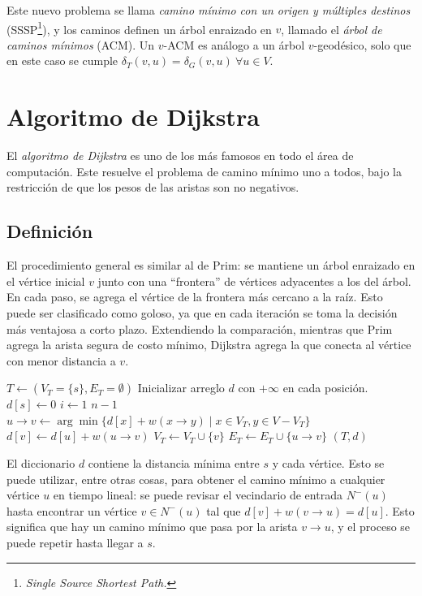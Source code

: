 \documentclass[a4paper]{report}
\begin{document}
Este nuevo problema se llama \textit{camino mínimo con un origen y múltiples destinos} (SSSP\footnote{\textit{Single Source Shortest Path.}}), y los caminos definen un árbol enraizado en $v$, llamado el \textit{árbol de caminos mínimos} (ACM). Un $v$-ACM es análogo a un árbol $v$-geodésico, solo que en este caso se cumple $\delta_T(v, u) = \delta_G(v, u)\ \forall u \in V$.

\section{Algoritmo de Dijkstra}

El \textit{algoritmo de Dijkstra} es uno de los más famosos en todo el área de computación. Este resuelve el problema de camino mínimo uno a todos, bajo la restricción de que los pesos de las aristas son no negativos.

\subsection{Definición}

El procedimiento general es similar al de Prim: se mantiene un árbol enraizado en el vértice inicial $v$ junto con una ``frontera'' de vértices adyacentes a los del árbol. En cada paso, se agrega el vértice de la frontera más cercano a la raíz. Esto puede ser clasificado como goloso, ya que en cada iteración se toma la decisión más ventajosa a corto plazo. Extendiendo la comparación, mientras que Prim agrega la arista segura de costo mínimo, Dijkstra agrega la que conecta al vértice con menor distancia a $v$.

\begin{codebox}
    \li $T \gets (V_T = \{s\}, E_T = \emptyset)$
    \li Inicializar arreglo $d$ con $+\infty$ en cada posición.
    \li $d[s] \gets 0$
    \li \For $i \gets 1$ \To $n - 1$ \Do
    \li $u \rightarrow v \gets \arg\min{\{d[x] + w(x \rightarrow y) \mid x \in V_T, y \in V - V_T\}}$
    \li $d[v] \gets d[u] + w(u \rightarrow v)$
    \li $V_T \gets V_T \cup \{v\}$
    \li $E_T \gets E_T \cup \{u \rightarrow v\}$
    \End
    \li \Return $(T, d)$
\end{codebox}

El diccionario $d$ contiene la distancia mínima entre $s$ y cada vértice. Esto se puede utilizar, entre otras cosas, para obtener el camino mínimo a cualquier vértice $u$ en tiempo lineal: se puede revisar el vecindario de entrada $N^-(u)$ hasta encontrar un vértice $v \in N^-(u)$ tal que $d[v] + w(v \rightarrow u) = d[u]$. Esto significa que hay un camino mínimo que pasa por la arista $v \rightarrow u$, y el proceso se puede repetir hasta llegar a $s$.
\end{document}
